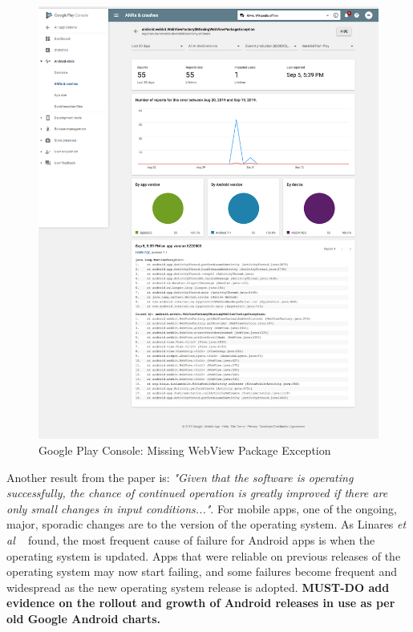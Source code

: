\begin{figure}[ht]
    \centering
    \includegraphics[width=14cm]{images/android-vitals-screenshots/55-crashes-WebViewFactory-MissingWebViewPackageException Screenshot_2019-09-19-kiwix.png}
    \caption{Google Play Console: Missing WebView Package Exception}
    \label{fig:55-crashes-missing-webview-package-exception}
\end{figure}

Another result from the paper is: \emph{"Given that the software is operating successfully, the chance of continued operation is greatly improved if there are only small changes in input conditions..."}. For mobile apps, one of the ongoing, major, sporadic changes are to the version of the operating system. As Linares \emph{et al} ~\cite{linares2013_api_change_and_fault_proneness_android} found, the most frequent cause of failure for Android apps is when the operating system is updated. Apps that were reliable on previous releases of the operating system may now start failing, and some failures become frequent and widespread as the new operating system release is adopted. \textbf{MUST-DO add evidence on the rollout and growth of Android releases in use as per old Google Android charts.}
~

